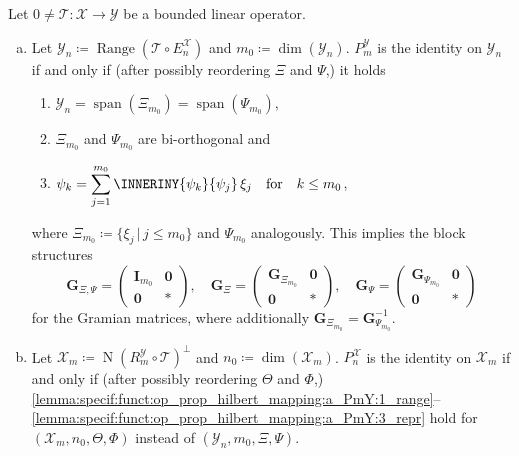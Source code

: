 \documentclass[a4paper]{paper}
\newcommand*{\SPC}[1]{{\ensuremath{\mathscr{#1}}}}
\newcommand*{\SPCX}{\SPC{X}}
\newcommand*{\SPCY}{\SPC{Y}}
\newcommand*{\OP}[1]{{\ensuremath{\mathcal{#1}}}}
\newcommand*{\OPT}{\OP{T}}
\newcommand*{\EXT}[2]{\ensuremath{E_{#1}^{#2}}}
\newcommand*{\REST}[2]{\ensuremath{R_{#1}^{#2}}}
\newcommand*{\PROJ}[2]{\ensuremath{P_{#1}^{#2}}}
\newcommand*{\RmY}{{\ensuremath{\REST{m}{\SPC{Y}}}}}
\newcommand*{\EnX}{{\ensuremath{\EXT{n}{\SPC{X}}}}}
\newcommand*{\PnX}{{\ensuremath{\PROJ{n}{\SPCX}}}}
\newcommand*{\PmY}{{\ensuremath{\PROJ{m}{\SPCY}}}}
\DeclareMathOperator{\RANGE}{Range}
\DeclareMathOperator{\NULL}{N}
\DeclareMathOperator{\SPAN}{span}
\DeclareMathOperator{\DIM}{dim}
\newcommand{\vzero}{\boldsymbol{0}}
\newcommand{\vG}{\boldsymbol{G}}
\newcommand{\vI}{\boldsymbol{I}}
\begin{document}
\begin{lemma}
 \label{lemma:specif:funct:op_prop_hilbert_mapping}
 Let $0 \neq \OPT\colon \SPCX \to \SPCY$ be a bounded linear operator. 
 
 \begin{enumerate}[(a)]
  \item \label{lemma:specif:funct:op_prop_hilbert_mapping:a_PmY}
  Let $\SPCY_n \coloneqq  \RANGE(\OPT \circ \EnX)$ and $m_0 \coloneqq  \DIM(\SPCY_n)$. $\PmY$ is the identity on 
$\SPCY_n$ if   and only if (after possibly reordering $\Xi$ and $\Psi$,) it holds
  \begin{enumerate}[({a}1)]
   \item \label{lemma:specif:funct:op_prop_hilbert_mapping:a_PmY:1_range}
   $\SPCY_n = \SPAN(\Xi_{m_0}) = \SPAN(\Psi_{m_0})$,
   \item \label{lemma:specif:funct:op_prop_hilbert_mapping:a_PmY:2_biorth}
   $\Xi_{m_0}$ and $\Psi_{m_0}$ are bi-orthogonal and
   \item \label{lemma:specif:funct:op_prop_hilbert_mapping:a_PmY:3_repr}
   $\displaystyle \psi_k = \sum_{j=1}^{m_0} \INNERINY{\psi_k}{\psi_j}\, \xi_j \quad \text{for} \quad k \leq m_0$,
  \end{enumerate}
  where $\Xi_{m_0} \coloneqq  \{ \xi_j\, |\, j\leq m_0 \}$ and $\Psi_{m_0}$ analogously. This implies the block 
  structures
  \renewcommand{\arraystretch}{1.1}
  \begin{equation*}
   \vG_{\Xi, \Psi} =
   \left(
   \begin{array}{c|c}
    \vI_{m_0} & \vzero \\[2pt]
    \hline
    \vzero & \boldsymbol{\ast}
   \end{array}
   \right),
   \quad
   \vG_\Xi =
   \left(
   \begin{array}{c|c}
    \vG_{\Xi_{m_0}} & \vzero \\[2pt]
    \hline
    \vzero & \boldsymbol{\ast}
   \end{array}
   \right),
   \quad
   \vG_\Psi =
   \left(
   \begin{array}{c|c}
    \vG_{\Psi_{m_0}} & \vzero \\[2pt]
    \hline
    \vzero & \boldsymbol{\ast}
   \end{array}
   \right)
  \end{equation*}
  \renewcommand{\arraystretch}{1.0}
  for the Gramian matrices, where additionally $\vG_{\Xi_{m_0}} = \vG_{\Psi_{m_0}}^{-1}$. 

  \item Let $\SPCX_m \coloneqq  \NULL(\RmY \circ \OPT)^\perp$ and $n_0 \coloneqq  \DIM(\SPCX_m)$. $\PnX$ is the 
identity on   $\SPCX_m$ if and only if (after possibly reordering $\Theta$ and $\Phi$,) 
  \eqref{lemma:specif:funct:op_prop_hilbert_mapping:a_PmY:1_range}--%
  \eqref{lemma:specif:funct:op_prop_hilbert_mapping:a_PmY:3_repr}
  hold for $(\SPCX_m, n_0, \Theta, \Phi)$ instead of $(\SPCY_n, m_0, \Xi, \Psi)$.
 \end{enumerate}

\end{lemma}
\vspace{1em}
\end{document}
